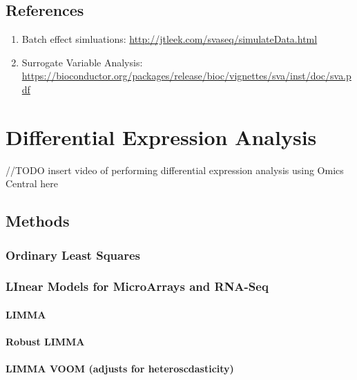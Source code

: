 \documentclass[]{book}
\providecommand{\tightlist}{%
  \setlength{\itemsep}{0pt}\setlength{\parskip}{0pt}}
\begin{document}
\section{References}\label{references}

\begin{enumerate}
\def\labelenumi{\arabic{enumi}.}
\tightlist
\item
  Batch effect simluations:
  \url{http://jtleek.com/svaseq/simulateData.html}
\item
  Surrogate Variable Analysis:
  \url{https://bioconductor.org/packages/release/bioc/vignettes/sva/inst/doc/sva.pdf}
\end{enumerate}

\chapter{Differential Expression Analysis}\label{diff-exp}

//TODO insert video of performing differential expression analysis using
Omics Central here

\section{Methods}\label{methods}

\subsection{Ordinary Least Squares}\label{ordinary-least-squares}

\subsection{LInear Models for MicroArrays and
RNA-Seq}\label{linear-models-for-microarrays-and-rna-seq}

\subsubsection{LIMMA}\label{limma}

\subsubsection{Robust LIMMA}\label{robust-limma}

\subsubsection{LIMMA VOOM (adjusts for
heteroscdasticity)}\label{limma-voom-adjusts-for-heteroscdasticity}
\end{document}

